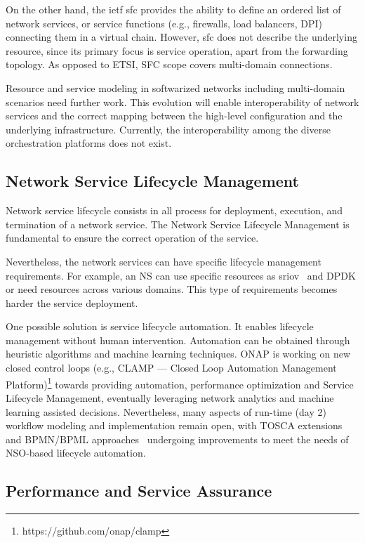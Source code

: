 On the other hand, the \gls{ietf} \gls{sfc} provides the ability to define an ordered list of network services, or service functions (e.g., firewalls, load balancers, DPI) connecting them in a virtual chain. However, \gls{sfc} does not describe the underlying resource, since its primary focus is service operation, apart from the forwarding topology. As opposed to ETSI, SFC scope covers multi-domain connections.   

Resource and service modeling in softwarized networks including multi-domain scenarios need further work. This evolution will enable interoperability of network services and the correct mapping between the high-level configuration and the underlying infrastructure. Currently, the interoperability among the diverse orchestration platforms does not exist.


\subsection{Network Service Lifecycle Management}

Network service lifecycle consists in all process for deployment, execution, and termination of a network service. The Network Service Lifecycle Management is fundamental to ensure the correct operation of the service.

Nevertheless, the network services can have specific lifecycle management requirements. For example, an NS can use specific resources as \gls{sriov}~\cite{5416637} and DPDK or need resources across various domains. This type of requirements becomes harder the service deployment.

One possible solution is service lifecycle automation. It enables lifecycle management without human intervention. Automation can be obtained through heuristic algorithms and machine learning techniques. ONAP is working on new closed control loops (e.g., CLAMP --- Closed Loop Automation Management Platform)\footnote{https://github.com/onap/clamp} towards providing automation, performance optimization and Service Lifecycle Management, eventually leveraging network analytics and machine learning assisted decisions.
Nevertheless, many aspects of run-time (day 2) workflow modeling and implementation remain open, with TOSCA extensions and BPMN/BPML approaches~\cite{DBLP:conf/closer/CalcaterraCMT17} undergoing improvements to meet the needs of NSO-based lifecycle automation. 


\subsection{Performance and  Service Assurance}

